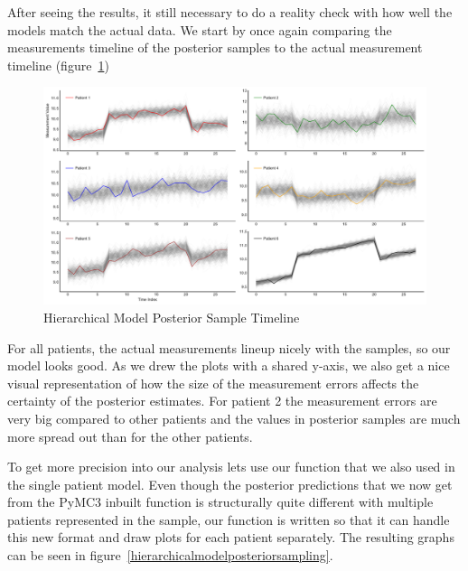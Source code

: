 \documentclass[12pt,a4paper,leqno]{report}
\theoremstyle{plain}
\theoremstyle{definition}
\theoremstyle{remark}
\begin{document}
After seeing the results, it still necessary to do a reality check with how well the
models match the actual data. We start by once again comparing the measurements timeline
of the posterior samples to the actual measurement timeline (figure\ \ref{hierarhicalmodelposteriortimeline})

\bigskip
\begin{figure}[H]
    \caption{Hierarchical Model Posterior Sample Timeline}\label{hierarhicalmodelposteriortimeline}
    \bigskip
    \includegraphics[width=\textwidth,height=\textheight,keepaspectratio]{posterior_sample_timeline_hierarchical_model.pdf}
\end{figure}
\bigskip

For all patients, the actual measurements lineup nicely with the samples, so our model
looks good. As we drew the plots with a shared y-axis, we also get a nice visual
representation of how the size of the measurement errors
affects the certainty of the posterior estimates. For patient 2 the measurement errors are
very big compared to other patients and the values in posterior samples
are much more spread out than for the other patients.

To get more precision into our analysis lets use our 
function that we also used in the single patient model. Even though the posterior
predictions that we now get from the PyMC3 inbuilt
 function is structurally quite different with
multiple patients represented in the sample, our function is written
so that it can handle this new format and draw plots for each patient separately. The
resulting graphs can be seen in figure\ \ref{hierarchicalmodelposteriorsampling}.
\end{document}
